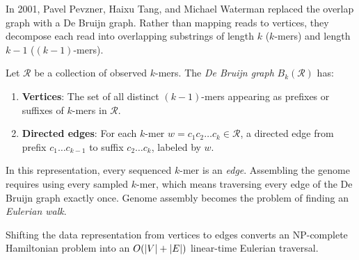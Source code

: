In 2001, Pavel Pevzner, Haixu Tang, and Michael Waterman replaced the overlap graph with a De Bruijn graph. Rather than mapping reads to vertices, they decompose each read into overlapping substrings of length $k$ ($k$-mers) and length $k-1$ ($(k-1)$-mers).

\begin{definition}
\label{ch05:def-debruijn}
Let $\mathcal{R}$ be a collection of observed $k$-mers. The \emph{De Bruijn graph} $B_k(\mathcal{R})$ has:
\begin{enumerate}
  \item \textbf{Vertices}: The set of all distinct $(k-1)$-mers appearing as prefixes or suffixes of $k$-mers in $\mathcal{R}$.
  \item \textbf{Directed edges}: For each $k$-mer $w = c_1 c_2 \dots c_k \in \mathcal{R}$, a directed edge from prefix $c_1 \dots c_{k-1}$ to suffix $c_2 \dots c_k$, labeled by $w$.
\end{enumerate}
\end{definition}

In this representation, every sequenced $k$-mer is an \emph{edge}. Assembling the genome requires using every sampled $k$-mer, which means traversing every edge of the De Bruijn graph exactly once. Genome assembly becomes the problem of finding an \emph{Eulerian walk}.

Shifting the data representation from vertices to edges converts an NP-complete Hamiltonian problem into an $O(\lvert V\rvert+\lvert E\rvert)$ linear-time Eulerian traversal.

